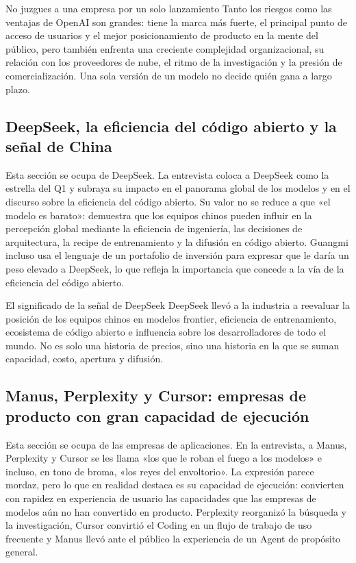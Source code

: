 \begin{warningbox}{No juzgues a una empresa por un solo lanzamiento}
Tanto los riesgos como las ventajas de OpenAI son grandes: tiene la marca más fuerte, el principal punto de acceso de usuarios y el mejor posicionamiento de producto en la mente del público, pero también enfrenta una creciente complejidad organizacional, su relación con los proveedores de nube, el ritmo de la investigación y la presión de comercialización. Una sola versión de un modelo no decide quién gana a largo plazo.
\end{warningbox}

\subsection{DeepSeek, la eficiencia del código abierto y la señal de China}

Esta sección se ocupa de DeepSeek. La entrevista coloca a DeepSeek como la estrella del Q1 y subraya su impacto en el panorama global de los modelos y en el discurso sobre la eficiencia del código abierto. Su valor no se reduce a que «el modelo es barato»: demuestra que los equipos chinos pueden influir en la percepción global mediante la eficiencia de ingeniería, las decisiones de arquitectura, la recipe de entrenamiento y la difusión en código abierto. Guangmi incluso usa el lenguaje de un portafolio de inversión para expresar que le daría un peso elevado a DeepSeek, lo que refleja la importancia que concede a la vía de la eficiencia del código abierto.

\begin{importantbox}{El significado de la señal de DeepSeek}
DeepSeek llevó a la industria a reevaluar la posición de los equipos chinos en modelos frontier, eficiencia de entrenamiento, ecosistema de código abierto e influencia sobre los desarrolladores de todo el mundo. No es solo una historia de precios, sino una historia en la que se suman capacidad, costo, apertura y difusión.
\end{importantbox}

\subsection{Manus, Perplexity y Cursor: empresas de producto con gran capacidad de ejecución}

Esta sección se ocupa de las empresas de aplicaciones. En la entrevista, a Manus, Perplexity y Cursor se les llama «los que le roban el fuego a los modelos» e incluso, en tono de broma, «los reyes del envoltorio». La expresión parece mordaz, pero lo que en realidad destaca es su capacidad de ejecución: convierten con rapidez en experiencia de usuario las capacidades que las empresas de modelos aún no han convertido en producto. Perplexity reorganizó la búsqueda y la investigación, Cursor convirtió el Coding en un flujo de trabajo de uso frecuente y Manus llevó ante el público la experiencia de un Agent de propósito general.

